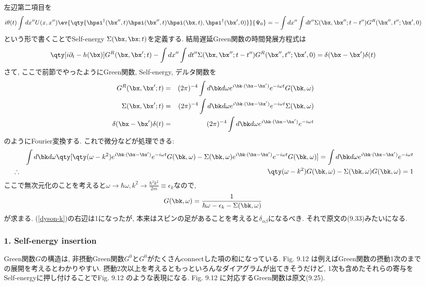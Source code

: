 \documentclass[10.5pt,a4paper]{jreport}
\begin{document}
左辺第二項目を
\begin{eqnarray}
  \nonumber  i\theta(t)\int dx''U(x, x'')\ev{\qty{\hpsi^\dagger(\bx'', t)\hpsi(\bx'', t)\hpsi(\bx, t), \hpsi^\dagger(\bx', 0)}}{\Psi_0} = -\int dx''\int dt''\Sigma(\bx, \bx''; t - t'')G^R(\bx'', t''; \bx', 0)\\
\end{eqnarray}
という形で書くことでSelf-energy $\Sigma(\bx, \bx; t)$を定義する. 結局遅延Green関数の時間発展方程式は
\begin{eqnarray}
  \qty[i\partial_t -h(\bx)]G^R(\bx,\bx';t) -\int dx''\int dt''\Sigma(\bx, \bx''; t - t'')G^R(\bx'', t''; \bx', 0)= \delta(\bx-\bx')\delta(t)
\end{eqnarray}
さて, ここで前節でやったようにGreen関数, Self-energy, デルタ関数を
\begin{eqnarray}
  G^R(\bx, \bx';t) &=& (2\pi)^{-4}\int d\bk d\omega e^{i\bk\cdot(\bx-\bx')}e^{-i\omega t}G(\bk, \omega)\\
  \Sigma(\bx, \bx';t) &=& (2\pi)^{-4}\int d\bk d\omega e^{i\bk\cdot(\bx-\bx')}e^{-i\omega t}\Sigma(\bk, \omega)\\
  \delta(\bx - \bx')\delta(t) &=& (2\pi)^{-4}\int d\bk d\omega e^{i\bk\cdot(\bx - \bx')}e^{-i\omega t}
\end{eqnarray}
のようにFourier変換する. これで微分などが処理できる:
\begin{eqnarray}
  \nonumber  &&\int d\bk d\omega \qty[\qty(\omega - k^2)e^{i\bk\cdot(\bx-\bx')}e^{-i\omega t}G(\bk, \omega) - \Sigma(\bk, \omega)e^{i\bk\cdot(\bx-\bx')}e^{-i\omega t}G(\bk, \omega)]= \int d\bk d\omega e^{i\bk\cdot(\bx - \bx')}e^{-i\omega t}\\
  &\therefore& \qty(\omega - k^2)G(\bk, \omega) - \Sigma(\bk, \omega)G(\bk, \omega)= 1\label{dyson-k}
\end{eqnarray}
ここで無次元化のことを考えると$\omega\rightarrow\hbar\omega, k^2\rightarrow \frac{\hbar^2k^2}{2m}\equiv\epsilon_k$なので,
\begin{eqnarray}
  G(\bk, \omega) = \frac{1}{\hbar\omega - \epsilon_k - \Sigma(\bk, \omega)}
\end{eqnarray}
が求まる. (\ref{dyson-k})の右辺は1になったが, 本来はスピンの足があることを考えると$\delta_{\alpha\beta}$になるべき. それで原文の(9.33)みたいになる.

\subsubsection{1. Self-energy insertion}
Green関数$G$の構造は, 非摂動Green関数$G^0$と$G^0$がたくさんconnectした項の和になっている. Fig. 9.12 は例えばGreen関数の摂動1次のまでの展開を考えるとわかりやすい. 摂動2次以上を考えるともっといろんなダイアグラムが出てきそうだけど, 1次も含めたそれらの寄与をSelf-energyに押し付けることでFig. 9.12 のような表現になる. Fig. 9.12 に対応するGreen関数は原文(9.25).
\end{document}

